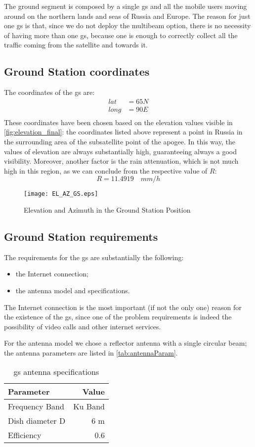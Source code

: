 The ground segment is composed by a single \gls{gs} and all the mobile users moving around on the northern lands and seas of Russia and Europe. The reason for just one \gls{gs} is that, since we do not deploy the multibeam option, there is no necessity of having more than one \gls{gs}, because one is enough to correctly collect all the traffic coming from the satellite and towards it.
\subsection{Ground Station coordinates}
	The coordinates of the \gls{gs} are:
	\begin{align}
	lat &= 65N\\
	long &= 90E\\
	\end{align}
	These coordinates have been chosen based on the elevation values visible in \autoref{fig:elevation_final}: the coordinates listed above represent a point in Russia in the surrounding area of the subsatellite point of the apogee. In this way, the values of elevation are always substantially high, guaranteeing always a good visibility. Moreover, another factor is the rain attenuation, which is not much high in this region, as we can conclude from the respective value of $R$:
	\begin{equation}
	R = 11.4919 \quad mm/h
	\end{equation}
	\begin{figure}[htbp]
		\centering
		\texttt{[image: EL\_AZ\_GS.eps]}
		\caption{Elevation and Azimuth in the Ground Station Position}
		\label{fig:elevation_final}
	\end{figure}
\subsection{Ground Station requirements}
	The requirements for the \gls{gs} are substantially the following:
	\begin{itemize}
		\item the Internet connection;
		\item the antenna model and specifications.
	\end{itemize}

	The Internet connection is the most important (if not the only one) reason for the existence of the \gls{gs}, since one of the problem requirements is indeed the possibility of video calls and other internet services.

	For the antenna model we chose a reflector antenna with a single circular beam; the antenna parameters are listed in \autoref{tab:antennaParam}.
	\begin{table}
		\centering
		\begin{tabular}{lr}
		\toprule
		Parameter & Value\\
		\midrule
		Frequency Band & Ku Band\\
		Dish diameter D & 6 m\\
		Efficiency & 0.6\\
		\bottomrule
		\end{tabular}
		\caption{\gls{gs} antenna specifications}
		\label{tab:antennaParam}
	\end{table}

